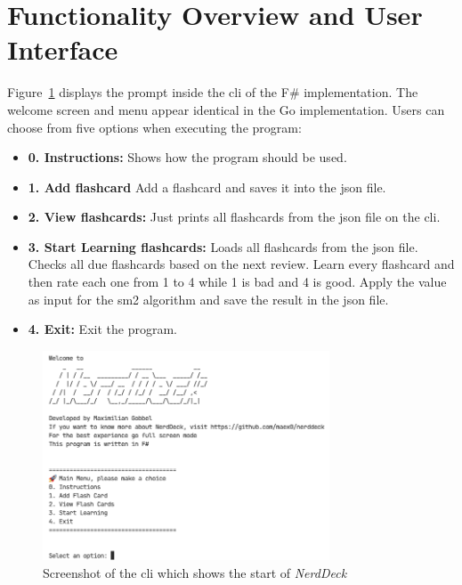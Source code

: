    \section{Functionality Overview and User Interface}\label{sec:functionalityoverview}
    Figure\ \ref{fig:screenshotcli} displays the prompt inside the \ac{cli} of the F\# implementation. The welcome screen and menu appear identical in the Go implementation. Users can choose from five options when executing the program:        
    \begin{itemize}
        \item \textbf{0. Instructions:} Shows how the program should be used.
        \item \textbf{1. Add flashcard} Add a flashcard and saves it into the \ac{json} file.
        \item \textbf{2. View flashcards:} Just prints all flashcards from the \ac{json} file on the \ac{cli}.
        \item \textbf{3. Start Learning flashcards:} Loads all flashcards from the \ac{json} file. Checks all due flashcards based on the next review. Learn every flashcard and then rate each one from 1 to 4 while 1 is bad and 4 is good. Apply the value as input for the \ac{sm2} algorithm and save the result in the \ac{json} file.
        \item \textbf{4. Exit:} Exit the program.
    \end{itemize}

    \begin{figure}
        \centering
        \includegraphics[width=0.76\textwidth]{ScreenshotNerdDeck.png}
        \caption{Screenshot of the \ac{cli} which shows the start of \textit{NerdDeck}}\label{fig:screenshotcli}
    \end{figure}




